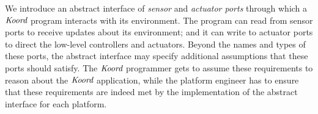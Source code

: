 \begin{noinditem}
\item We introduce an abstract interface of \emph{sensor} and \emph{actuator ports} through which a $\emph{Koord}$ program interacts with its environment. The program can read from sensor ports to receive updates about its environment;  and it can write to actuator ports to direct the low-level controllers and actuators. Beyond the names and types of these ports, the abstract interface may specify additional assumptions  that these ports should satisfy. The $\emph{Koord}$ programmer gets to assume these requirements to reason about the $\emph{Koord}$ application, while the platform engineer has to ensure that these requirements are indeed met by the implementation of the abstract interface for each platform.



\end{noinditem}
